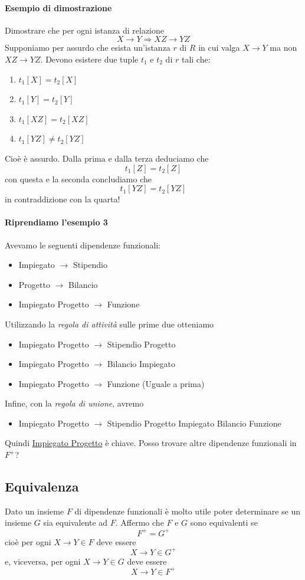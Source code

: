 \paragraph{Esempio di dimostrazione} Dimostrare che per ogni istanza di relazione
\[X \to Y \Rightarrow XZ \to YZ\]
Supponiamo per assurdo che esista un'istanza $r$ di $R$ in cui valga $X \to Y$ ma non $XZ \to YZ$. Devono esistere due tuple $t_1$ e $t_2$ di $r$ tali che:
\begin{enumerate}
	\item $t_1[X]=t_2[X]$
	\item $t_1[Y] = t_2[Y]$
	\item $t_1[XZ]=t_2[XZ]$
	\item $t_1[YZ]\neq t_2[YZ]$
\end{enumerate}
Cioè è assurdo. Dalla prima e dalla terza deduciamo che
\[t_1[Z] = t_2[Z]\]
con questa e la seconda concludiamo che
\[t_1[YZ]=t_2[YZ]\]
in contraddizione con la quarta!

\paragraph{Riprendiamo l'esempio 3} Avevamo le seguenti dipendenze funzionali:
\begin{itemize}
	\item Impiegato $\longrightarrow$ Stipendio
	\item Progetto $\longrightarrow$ Bilancio
	\item Impiegato Progetto $\longrightarrow$ Funzione
\end{itemize}
Utilizzando la \emph{regola di attività} sulle prime due otteniamo
\begin{itemize}
	\item Impiegato Progetto $\longrightarrow$ Stipendio Progetto
	\item Impiegato Progetto $\longrightarrow$ Bilancio Impiegato
	\item Impiegato Progetto $\longrightarrow$ Funzione (Uguale a prima)
\end{itemize}
Infine, con la \emph{regola di unione}, avremo
\begin{itemize}
	\item Impiegato Progetto $\longrightarrow$ Stipendio Progetto Impiegato Bilancio Funzione
\end{itemize}
Quindi \underline{Impiegato Progetto} è chiave. Posso trovare altre dipendenze funzionali in $F^{+}$?
\subsection{Equivalenza}
Dato un insieme $F$ di dipendenze funzionali è molto utile poter determinare se un insieme $G$ sia equivalente ad $F$. Affermo che $F$ e $G$ sono equivalenti se
\[F^{+}=G^{+}\]
cioè per ogni $X \to Y \in F$ deve essere \[X \to Y \in G^{+}\] e, viceversa, per ogni $X \to Y \in G$ deve essere \[X \to Y \in F^{+}\]
